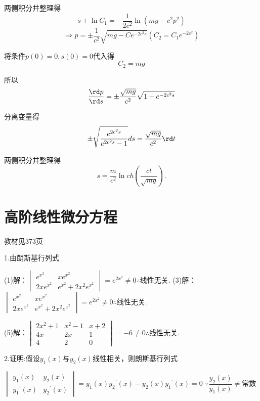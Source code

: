   两侧积分并整理得\[s + \ln {C_1} =  - \dfrac{1}{{2{c^2}}}\ln \left( {mg - {c^2}{p^2}} \right)\]
  \[ \Rightarrow p =  \pm \dfrac{1}{{{c^2}}}\sqrt {mg - C{e^{ - 2{c^2}s}}} ({C_2} = {C_1}{e^{ - 2{c^2}}})\]

  将条件$p(0) = 0,s(0) = 0$代入得\[{C_2} = mg\]

  所以\[\dfrac{{\rd p}}{{\rd s}} =  \pm \dfrac{{\sqrt {mg} }}{{{c^2}}}\sqrt {1 - {e^{ - 2{c^2}s}}} \]

  分离变量得\[ \pm \sqrt {\dfrac{{{e^{2{c^2}s}}}}{{{e^{2{c^2}s}} - 1}}} ds = \dfrac{{\sqrt {mg} }}{{{c^2}}}\rd t\]

  两侧积分并整理得\[s = \dfrac{m}{{{c^2}}}\ln ch\left( {\dfrac{{ct}}{{\sqrt {mg} }}} \right).\]

\section{高阶线性微分方程}
\begin{flushright}
  \color{zhanqing!80}
   教材见373页
\end{flushright}
  1.由朗斯基行列式

  (1)解：$\begin{vmatrix}
    {{e^{{x^2}}}}&{x{e^{{x^2}}}} \\
    {2x{e^{{x^2}}}}&{{e^{{x^2}}} + 2{x^2}{e^{{x^2}}}}
  \end{vmatrix} = {e^{2{x^2}}} \ne 0$$\therefore $线性无关. \qquad
  (3)解：$\begin{vmatrix}
    {{e^{{x^2}}}}&{x{e^{{x^2}}}} \\
    {2x{e^{{x^2}}}}&{{e^{{x^2}}} + 2{x^2}{e^{{x^2}}}}
  \end{vmatrix} = {e^{2{x^2}}} \ne 0$$\therefore $线性无关.

  (5)解：$\begin{vmatrix}
    {2{x^2} + 1}&{{x^2} - 1}&{x + 2} \\
    {4x}&{2x}&1 \\
    4&2&0
  \end{vmatrix} =  - 6 \ne 0$$\therefore $线性无关.

  2.证明:假设${y_1}(x)$与${y_2}(x)$线性相关，则朗斯基行列式

  $\begin{vmatrix}
    {{y_1}\left( x \right)}&{{y_2}\left( x \right)} \\
    {{y_1}^\prime \left( x \right)}&{{y_2}^\prime \left( x \right)}
  \end{vmatrix} = {y_1}\left( x \right){y_2}^\prime \left( x \right) - {y_2}\left( x \right){y_1}^\prime \left( x \right) = 0$ \quad
  $\because \dfrac{{{y_2}\left( x \right)}}{{{y_1}\left( x \right)}} \ne $常数

